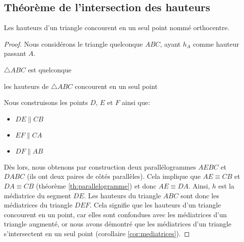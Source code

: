 \documentclass[a4paper,12pt]{article}
\begin{document}
\subsection{Théorème de l'intersection des hauteurs}
\begin{theorem}
Les hauteurs d'un triangle concourent en un seul point nommé orthocentre.
\end{theorem}

\begin{proof}
Nous considérons le triangle quelconque $ABC$, ayant $h_A$ comme hauteur passant $A$.
\begin{hyp}
$\triangle ABC$ est quelconque
\end{hyp}
\begin{concl}
les hauteurs de $\triangle ABC$ concourent en un seul point
\end{concl}
Nous construisons les points $D$, $E$ et $F$ ainsi que:
\begin{itemize}
    \item $DE \parallel CB$
    \item $EF \parallel CA$
    \item $DF \parallel AB$
\end{itemize}
Dès lors, nous obtenons par construction deux parallélogrammes $AEBC$ et $DABC$ (ils ont deux paires de côtés parallèles). Cela implique que $AE \equiv CB$ et $DA \equiv CB$ (théorème \ref{th:parallelogramme}) et donc $AE \equiv DA$. Ainsi, $h$ est la médiatrice du segment $DE$. Les hauteurs du triangle $ABC$ sont donc les médiatrices du triangle $DEF$. Cela signifie que les hauteurs d'un triangle concourent en un point, car elles sont confondues avec les médiatrices d'un triangle augmenté, or nous avons démontré que les médiatrices d'un triangle s'intersectent en un seul point (corollaire \ref{cor:mediatrices}).
\end{proof}
\end{document}
